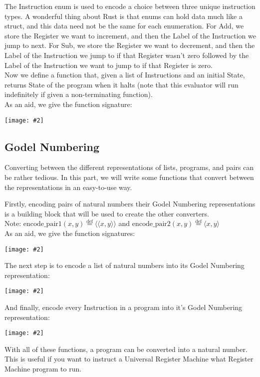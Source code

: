 \documentclass{report}
\newcommand{\centerimg}[2]{\begin{center}\texttt{[image: \#2]}\end{center}}
\newcommand*{\defeq}{\stackrel{\text{def}}{=}}
\begin{document}
The Instruction enum is used to encode a choice between three unique instruction types.
A wonderful thing about Rust is that enums can hold data much like a struct, and
this data need not be the same for each enumeration. For Add, we store the Register we
want to increment, and then the Label of the Instruction we jump to next. For Sub,
we store the Register we want to decrement, and then the Label of the Instruction we 
jump to if that Register wasn't zero followed by the Label of the Instruction we want to
jump to if that Register is zero.\\


Now we define a function that, given a list of Instructions and an initial State,
returns State of the program when it halts (note that this evaluator will run
indefinitely if given a non-terminating function).\\


As an aid, we give the function signature:
\centerimg{width=\textwidth}{EvalProgram}

\subsection*{Godel Numbering}
Converting between the different representations of lists, programs, and pairs can
be rather tedious. In this part, we will write some functions that convert between
the representations in an easy-to-use way.


Firstly, encoding pairs of natural numbers their Godel Numbering representations
is a building block that will be used to create the other converters.
\\
Note: $\text{encode\_pair1}(x,y) \defeq \langle\langle x,y \rangle\rangle $ and 
$\text{encode\_pair2}(x,y) \defeq \langle x,y \rangle $\\

As an aid, we give the function signatures:
\centerimg{width=\textwidth}{EncodePairs}

The next step is to encode a list of natural numbers into its Godel Numbering representation:
\centerimg{width=\textwidth}{EncodeList}

And finally, encode every Instruction in a program into it's Godel Numbering representation:
\centerimg{width=\textwidth}{EncodeProgram}

With all of these functions, a program can be converted into a natural number.
This is useful if you want to instruct a Universal Register Machine what Register 
Machine program to run.\\
\end{document}
